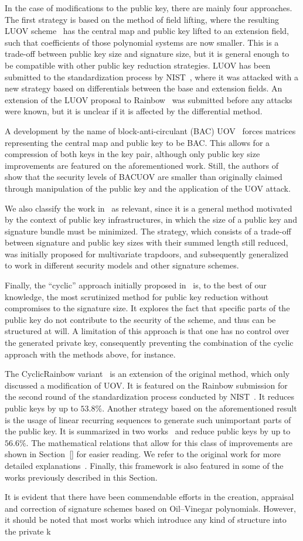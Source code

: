 \documentclass[draft, 12pt, a4paper, oneside]{memoir}
\begin{document}
In the case of modifications to the public key, there are mainly four approaches. The first strategy is based on the method of field lifting, where the resulting LUOV scheme~\cite{} has the central map and public key lifted to an extension field, such that coefficients of those polynomial systems are now smaller. This is a trade-off between public key size and signature size, but it is general enough to be compatible with other public key reduction strategies. LUOV has been submitted to the standardization process by NIST~\cite{}, where it was attacked with a new strategy based on differentials between the base and extension fields. An extension of the LUOV proposal to Rainbow~\cite{} was submitted before any attacks were known, but it is unclear if it is affected by the differential method.

A development by the name of block-anti-circulant (BAC) UOV~\cite{} forces matrices representing the central map and public key to be BAC. This allows for a compression of both keys in the key pair, although only public key size improvements are featured on the aforementioned work. Still, the authors of~\cite{} show that the security levels of BACUOV are smaller than originally claimed through manipulation of the public key and the application of the UOV attack.

We also classify the work in~\cite{} as relevant, since it is a general method motivated by the context of public key infrastructures, in which the size of a public key and signature bundle must be minimized. The strategy, which consists of a trade-off between signature and public key sizes with their summed length still reduced, was initially proposed for multivariate trapdoors, and subsequently generalized~\cite{} to work in different security models and other signature schemes.

Finally, the ``cyclic'' approach initially proposed in~\cite{} is, to the best of our knowledge, the most scrutinized method for public key reduction without compromises to the signature size. It explores the fact that specific parts of the public key do not contribute to the security of the scheme, and thus can be structured at will. A limitation of this approach is that one has no control over the generated private key, consequently preventing the combination of the cyclic approach with the methods above, for instance.

The CyclicRainbow variant~\cite{} is an extension of the original method, which only discussed a modification of UOV. It is featured on the Rainbow submission for the second round of the standardization process conducted by NIST~\cite{}. It reduces public keys by up to $53.8\%$. Another strategy based on the aforementioned result is the usage of linear recurring sequences to generate such unimportant parts of the public key. It is summarized in two works~\cite{} and reduce public keys by up to $56.6\%$. The mathematical relations that allow for this class of improvements are shown in Section~\ref{} for easier reading. We refer to the original work for more detailed explanations~\cite{}. Finally, this framework is also featured in some of the works previously described in this Section.

It is evident that there have been commendable efforts in the creation, appraisal and correction of signature schemes based on Oil--Vinegar polynomials. However, it should be noted that most works which introduce any kind of structure into the private k



\end{document}
